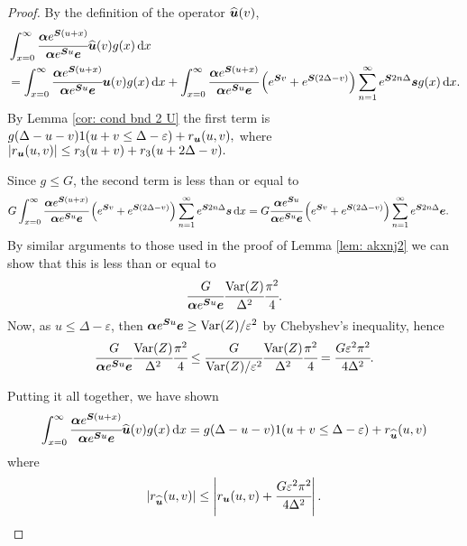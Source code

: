 \begin{proof}
	By the definition of the operator \(\widehat{\boldsymbol u}(v)\), 
	\begin{align}
		&\int_{x=0}^\infty \cfrac{\boldsymbol \alpha  e^{\boldsymbol{S} (u+x)} }{\boldsymbol \alpha  e^{\boldsymbol{S} u} \boldsymbol e} \widehat{\boldsymbol u}(v)g(x)\, \mathrm{d} x \nonumber		
		\\&= \int_{x=0}^\infty \cfrac{\boldsymbol \alpha  e^{\boldsymbol{S} (u+x)} }{\boldsymbol \alpha  e^{\boldsymbol{S} u} \boldsymbol e} \boldsymbol u(v)g(x)\, \mathrm{d} x + \int_{x=0}^\infty \cfrac{\boldsymbol \alpha  e^{\boldsymbol{S} (u+x)} }{\boldsymbol \alpha  e^{\boldsymbol{S} u} \boldsymbol e} \left(e^{\boldsymbol{S} v} + e^{\boldsymbol{S} (2\Delta-v)}\right)\sum_{n=1}^\infty e^{\boldsymbol S2n\Delta}\boldsymbol s g(x)\, \mathrm{d} x. \label{eqn: ghi is this a2}
	\end{align}
	By Lemma \ref{cor: cond bnd 2 U} the first term is 
	\(g(\Delta-u-v) 1(u+v\leq\Delta-\varepsilon) + r_{\boldsymbol u} (u,v),\)
	where 
	\(\left|r_{\boldsymbol u} (u,v)\right|\leq r_3 (u+v) + r_3 (u+2\Delta - v).\)

	Since \(g\leq G\), the second term is less than or equal to 
	\begin{align*}
		G\int_{x=0}^\infty \cfrac{\boldsymbol \alpha  e^{\boldsymbol{S} (u+x)} }{\boldsymbol \alpha  e^{\boldsymbol{S} u} \boldsymbol e} \left(e^{\boldsymbol{S} v} + e^{\boldsymbol{S} (2\Delta-v)}\right)\sum_{n=1}^\infty e^{\boldsymbol S2n\Delta}\boldsymbol s \, \mathrm{d} x
		&= G \cfrac{\boldsymbol \alpha  e^{\boldsymbol{S} u} }{\boldsymbol \alpha  e^{\boldsymbol{S} u} \boldsymbol e} \left(e^{\boldsymbol{S} v} + e^{\boldsymbol{S} (2\Delta-v)}\right)\sum_{n=1}^\infty e^{\boldsymbol S2n\Delta}\boldsymbol e.
	\end{align*}
	By similar arguments to those used in the proof of Lemma \ref{lem: akxnj2} we can show that this is less than or equal to 
	\begin{align*}
		\cfrac{G}{\boldsymbol \alpha  e^{\boldsymbol{S} u} \boldsymbol e} \cfrac{\mathrm{Var}(Z)}{\Delta^2}\cfrac{\pi^2}{4}.
	\end{align*}
	Now, as \(u\leq \Delta-\varepsilon\), then \(\boldsymbol\alpha e^{\boldsymbol Su}\boldsymbol e\geq \mathrm{Var}(Z)/\varepsilon^2\) by Chebyshev's inequality, hence 
	\begin{align*}
		\cfrac{G}{\boldsymbol \alpha  e^{\boldsymbol{S} u} \boldsymbol e} \cfrac{\mathrm{Var}(Z)}{\Delta^2}\cfrac{\pi^2}{4} \leq \cfrac{G}{\mathrm{Var}(Z)/\varepsilon^2} \cfrac{\mathrm{Var}(Z)}{\Delta^2}\cfrac{\pi^2}{4} = \cfrac{G \varepsilon^2 \pi^2}{4\Delta^2}.
	\end{align*}

	Putting it all together, we have shown 
	\begin{align}
		\int_{x=0}^\infty \cfrac{\boldsymbol \alpha  e^{\boldsymbol{S} (u+x)} }{\boldsymbol \alpha  e^{\boldsymbol{S} u} \boldsymbol e} \widehat{\boldsymbol u}(v)g(x)\, \mathrm{d} x = g(\Delta-u-v) 1(u+v\leq\Delta-\varepsilon) + r_{\widehat{\boldsymbol u}} (u,v)
	\end{align}
	where 
	\[|r_{\widehat{\boldsymbol u}} (u,v)| \leq \left|r_{\boldsymbol u} (u,v) + \cfrac{G \varepsilon^2 \pi^2}{4\Delta^2}\right|.\]
	

\end{proof}
